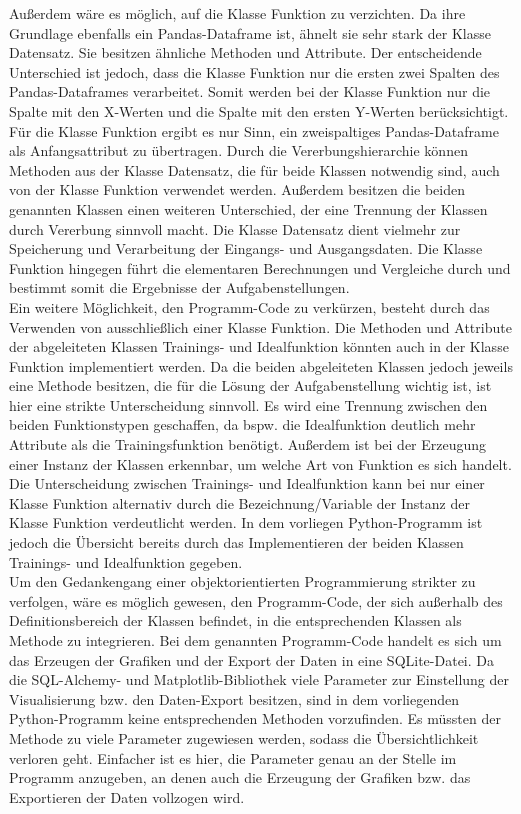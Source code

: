 \documentclass[11pt,a4paper]{scrreprt}
\begin{document}
Außerdem wäre es möglich, auf die Klasse Funktion zu verzichten. Da ihre Grundlage ebenfalls ein Pandas-Dataframe ist, ähnelt sie sehr stark der Klasse Datensatz. Sie besitzen ähnliche Methoden und Attribute. Der entscheidende Unterschied ist jedoch, dass die Klasse Funktion nur die ersten zwei Spalten des Pandas-Dataframes verarbeitet. Somit werden bei der Klasse Funktion nur die Spalte mit den X-Werten und die Spalte mit den ersten Y-Werten berücksichtigt. Für die Klasse Funktion ergibt es nur Sinn, ein zweispaltiges Pandas-Dataframe als Anfangsattribut zu übertragen. Durch die Vererbungshierarchie können Methoden aus der Klasse Datensatz, die für beide Klassen notwendig sind, auch von der Klasse Funktion verwendet werden. Außerdem besitzen die beiden genannten Klassen einen weiteren Unterschied, der eine Trennung der Klassen durch Vererbung sinnvoll macht. Die Klasse Datensatz dient vielmehr zur Speicherung und Verarbeitung der Eingangs- und Ausgangsdaten. Die Klasse Funktion hingegen führt die elementaren Berechnungen und Vergleiche durch und bestimmt somit die Ergebnisse der Aufgabenstellungen. \\
Ein weitere Möglichkeit, den Programm-Code zu verkürzen, besteht durch das Verwenden von ausschließlich einer Klasse Funktion. Die Methoden und Attribute der abgeleiteten Klassen Trainings- und Idealfunktion könnten auch in der Klasse Funktion implementiert werden. Da die beiden abgeleiteten Klassen jedoch jeweils eine Methode besitzen, die für die Lösung der Aufgabenstellung wichtig ist, ist hier eine strikte Unterscheidung sinnvoll. Es wird eine Trennung zwischen den beiden Funktionstypen geschaffen, da bspw. die Idealfunktion deutlich mehr Attribute als die Trainingsfunktion benötigt. Außerdem ist bei der Erzeugung einer Instanz der Klassen erkennbar, um welche Art von Funktion es sich handelt. Die Unterscheidung zwischen Trainings- und Idealfunktion kann bei nur einer Klasse Funktion alternativ durch die Bezeichnung/Variable der Instanz der Klasse Funktion verdeutlicht werden. In dem vorliegen Python-Programm ist jedoch die Übersicht bereits durch das Implementieren der beiden Klassen Trainings- und Idealfunktion gegeben. \\
Um den Gedankengang einer objektorientierten Programmierung strikter zu verfolgen, wäre es möglich gewesen, den Programm-Code, der sich außerhalb des Definitionsbereich der Klassen befindet, in die entsprechenden Klassen als Methode zu integrieren. Bei dem genannten Programm-Code handelt es sich um das Erzeugen der Grafiken und der Export der Daten in eine SQLite-Datei. Da die SQL-Alchemy- und Matplotlib-Bibliothek viele Parameter zur Einstellung der Visualisierung bzw. den Daten-Export besitzen, sind in dem vorliegenden Python-Programm keine entsprechenden Methoden vorzufinden. Es müssten der Methode zu viele Parameter zugewiesen werden, sodass die Übersichtlichkeit verloren geht. Einfacher ist es hier, die Parameter genau an der Stelle im Programm anzugeben, an denen auch die Erzeugung der Grafiken bzw. das Exportieren der Daten vollzogen wird. \\
\end{document}
